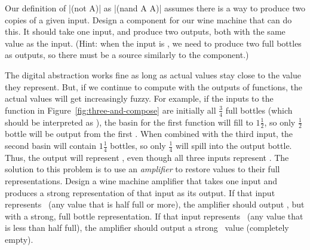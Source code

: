 \begin{schemeregion}


\beforeex
\begin{exercise} \goldstar \label{ex:copy}
Our definition of \scheme|(not A)| as \scheme|(nand A A)| assumes there is a way to produce two copies of a given input.  Design a component for our wine machine that can do this.  It should take one input, and produce two outputs, both with the same value as the input.  (Hint: when the input is \true, we need to produce two full bottles as outputs, so there must be a source similarly to the  component.)
\solution{\LATER{}}
\end{exercise}
\afterex

\beforesplitex
\begin{exercise} \goldstar \label{ex:amplifier}
The digital abstraction works fine as long as actual values stay close to the value they represent.  But, if we continue to compute with the outputs of functions, the actual values will get increasingly fuzzy.  For example, if the inputs to the  function in Figure~\ref{fig:three-and-compose} are initially all $\frac{3}{4}$ full bottles (which should be interpreted as \true), the basin for the first  function will fill to $1\frac{1}{2}$, so only $\frac{1}{2}$ bottle will be output from the first .  When combined with the third input, the second basin will contain $1\frac{1}{4}$ bottles, so only $\frac{1}{4}$ will spill into the output bottle.  Thus, the output will represent \false, even though all three inputs represent \true.  The solution to this problem is to use an \emph{amplifier} to restore values to their full representations.  Design a wine machine amplifier that takes one input and produces a strong representation of that input as its output.  If that input represents \true\ (any value that is half full or more), the amplifier should output \true, but with a strong, full bottle representation.  If that input represents \false\ (any value that is less than half full), the amplifier should output a strong \false\ value (completely empty).  
\solution{\LATER{}}
\end{exercise}
\aftersplitex


\end{schemeregion}

